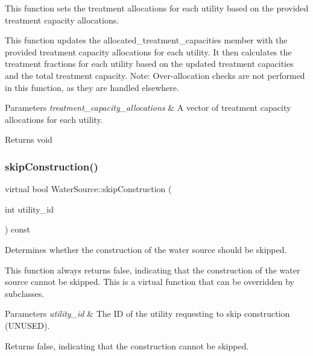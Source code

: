 This function sets the treatment allocations for each utility based on the provided treatment capacity allocations. 

This function updates the {\ttfamily allocated\+\_\+treatment\+\_\+capacities} member with the provided treatment capacity allocations for each utility. It then calculates the treatment fractions for each utility based on the updated treatment capacities and the total treatment capacity. Note\+: Over-\/allocation checks are not performed in this function, as they are handled elsewhere.


\begin{DoxyParams}{Parameters}
{\em treatment\+\_\+capacity\+\_\+allocations} & A vector of treatment capacity allocations for each utility.\\
\hline
\end{DoxyParams}
\begin{DoxyReturn}{Returns}
void 
\end{DoxyReturn}
\mbox{\label{classWaterSource_ad8496aea2d4ff97c8069b61cc984c799}} 
\subsubsection{\texorpdfstring{skip\+Construction()}{skipConstruction()}}
{\footnotesize\ttfamily virtual bool Water\+Source\+::skip\+Construction (\begin{DoxyParamCaption}\item[{int}]{utility\+\_\+id }\end{DoxyParamCaption}) const\hspace{0.3cm}{\ttfamily [virtual]}}



Determines whether the construction of the water source should be skipped. 

This function always returns {\ttfamily false}, indicating that the construction of the water source cannot be skipped. This is a virtual function that can be overridden by subclasses.


\begin{DoxyParams}{Parameters}
{\em utility\+\_\+id} & The ID of the utility requesting to skip construction (U\+N\+U\+S\+ED).\\
\hline
\end{DoxyParams}
\begin{DoxyReturn}{Returns}
{\ttfamily false}, indicating that the construction cannot be skipped. 
\end{DoxyReturn}
\mbox{\label{classWaterSource_a04f94831f4816bb277c5a615eace7779}} 
